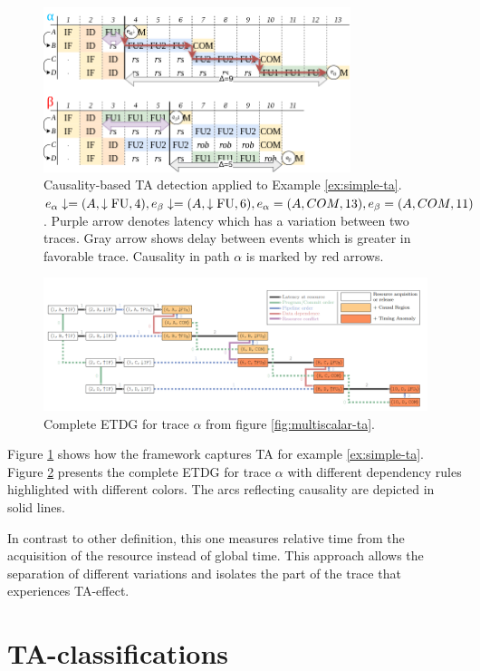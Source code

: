 \begin{figure}[htbp]
    \centering
    \includegraphics[width=0.8\textwidth]{figures/multiscalar_ta_causality.png}
    \caption{Causality-based TA detection applied to Example \ref{ex:simple-ta}. $e_\alpha\downarrow = (A, \downarrow\mathrm{FU}, 4), e_\beta\downarrow = (A, \downarrow\mathrm{FU}, 6), e_\alpha = (A, COM, 13), e_\beta = (A, COM, 11)$. Purple arrow denotes latency which has a variation between two traces. Gray arrow shows delay between events which is greater in favorable trace. Causality in  path $\alpha$ is marked by red arrows.}
    \label{fig:multiscalar-ta-causality}
\end{figure}

\begin{figure}[htbp]
    \centering
    \includegraphics[width=\textwidth]{figures/ETDG.png}
    \caption{Complete ETDG for trace $\alpha$ from figure \ref{fig:multiscalar-ta}. }
    \label{fig:ETDG}
\end{figure}

Figure \ref{fig:multiscalar-ta-causality} shows how the framework captures TA for example \ref{ex:simple-ta}. Figure \ref{fig:ETDG} presents the complete ETDG for trace $\alpha$ with different dependency rules highlighted with different colors. The arcs reflecting causality are depicted in solid lines.

In contrast to other definition, this one measures relative time from the acquisition of the resource instead of global time. This approach allows the separation of different variations and isolates the part of the trace that experiences TA-effect.


\section{TA-classifications}


